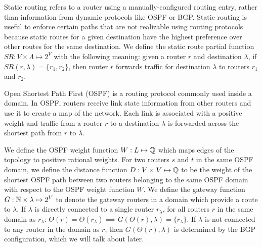  Static routing refers to a router using a
manually-configured routing entry, rather than information from
dynamic protocols like OSPF or BGP.  Static routing is useful to enforce certain
paths that are not realizable using routing protocols because 
static
routes for a given destination have the highest preference over other routes for the same destination.  
We define the static route partial
function $SR: V \times \Lambda \mapsto 2^V$ with the following meaning:  
given a router $r$
and destination $\lambda$, if $SR(r,\lambda)=\{r_1, r_2\}$, then router
$r$ forwards traffic for 
destination $\lambda$ to routers 
$r_1$ and $r_2$.    

 Open Shortest Path First (OSPF) is a routing
protocol commonly used inside a domain. In OSPF, routers receive link
state information from other routers and use it to create a map of
the network. Each link is associated with a positive weight and traffic from a router $r$ to
a destination $\lambda$ is forwarded across 
the shortest path from $r$ to $\lambda$.

We define the OSPF weight function $W: L \mapsto \mathbb{Q}$ which 
maps edges of the topology to positive rational weights.  
For two routers $s$ and $t$ in the same OSPF domain, 
we define the distance function $D:V \times V \mapsto \mathbb{Q}$ 
to be the weight of the shortest OSPF path between two routers
belonging to the same OSPF domain with respect to the  
OSPF weight function $W$.
We define the gateway function 
$G: \mathbb{N} \times \lambda \mapsto 2^V$ to denote the gateway routers 
in a domain which provide a route to $\lambda$. If $\lambda$ 
is directly connected to a single router $r_\lambda$, for all routers $r$ in the 
same domain as $r_\lambda$:  
$\Theta(r) = \Theta(r_\lambda) \implies G(\Theta(r), \lambda) = \{r_\lambda\}$.
If $\lambda$ is not connected
to any router in the domain as $r$, then $G(\Theta(r),\lambda)$ is 
determined by the BGP configuration, which we will talk about later. 




